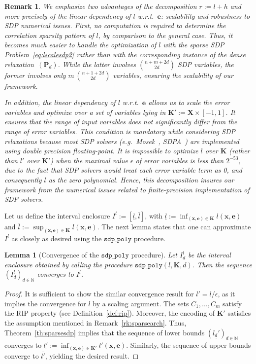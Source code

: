 \documentclass[preprint]{sigplanconf}
\newcommand{\N}{\mathbb{N}}
\newcommand{\x}{\mathbf{x}}
\newcommand{\e}{\mathbf{e}}
\def\P{\mathbf{P}}
\def\K{\mathbf{K}}
\def\X{\mathbf{X}}
\newcommand{\sdppolyfun}[3]{\mathtt{sdp\_poly}(#1, #2, #3)}
\newcommand{\sdppoly}{\mathtt{sdp\_poly}}
\newtheorem{lemma}[theorem]{Lemma}
\theoremstyle{plain}
\newtheorem{remark}{Remark}
\begin{document}
%
\begin{remark}
We emphasize two advantages of the decomposition $r := l + h$ and more precisely of the linear dependency of $l$ w.r.t.~$\e$: scalability and robustness to SDP numerical issues.
First, no computation is required to determine the correlation sparsity pattern of $l$, by comparison to the general case. Thus, it becomes much easier to handle the optimization of $l$ with the sparse SDP Problem~\eqref{eq:lscalesdp2} rather than with the corresponding instance of the dense relaxation~$(\P_d)$. While the latter involves $\binom{n + m+ 2 d}{2 d}$ SDP variables, the former involves only $m \, \binom{n + 1 + 2 d}{2 d}$ variables, ensuring the scalability of our framework.

In addition, the linear dependency of $l$ w.r.t.~$\e$ allows us to scale the error variables and optimize over a set of variables lying in $\K' := \X \times [-1, 1]$. It ensures that the range of input variables does not significantly differ from the range of error variables. This condition is mandatory while considering SDP relaxations because most SDP solvers (e.g.~{\sc Mosek}~\cite{mosek}, {\sc SDPA}~\cite{sdpa7}) are implemented using double precision floating-point. It is impossible to optimize $l$ over $\K$ (rather than $l'$ over $\K'$) when the maximal value $\epsilon$ of error variables is less than $2^{-53}$, due to the fact that SDP solvers would treat each error variable term as 0, and consequently $l$ as the zero polynomial. Hence, this decomposition insures our framework from the numerical issues related to finite-precision implementation of SDP solvers.
\end{remark}
%
Let us define the interval enclosure $I^l := [\underline{l}, \overline{l}]$, with $\underline{l} := \inf_{(\x,\e) \in \K} l(\x,\e)$ and $\overline{l} := \sup_{(\x,\e) \in \K} l(\x,\e)$.
The next lemma states that one can approximate $I^l$ as closely as desired using the $\sdppoly$ procedure.
\begin{lemma}[Convergence of the $\sdppoly$ procedure]
\label{th:cvg_sdppoly}
Let $I_d^l$ be the interval enclosure obtained by calling the procedure $\sdppolyfun{l}{\K}{d}$. Then the sequence $(I_d^l)_{d \in \N}$ converges to $I^l$.
\end{lemma}
%
\begin{proof}
It is sufficient to show the similar convergence result for $l' = l/\epsilon$, as it implies the convergence for $l$ by a scaling argument.
The sets $C_1,\dots, C_m$ satisfy the RIP property (see Definition~\ref{def:rip}). Moreover, the encoding of $\K'$ satisfies the assumption mentioned in Remark~\ref{rk:sparsearch}. Thus, Theorem~\ref{th:sparsesdp} implies that the sequence of lower bounds $(\underline{l_d'})_{d \in \N}$ converges to $\underline{l'} := \inf_{(\x,\e) \in \K'} l'(\x,\e)$. Similarly, the sequence of upper bounds converge to $\overline{l'}$, yielding the desired result.
\end{proof}
\end{document}
